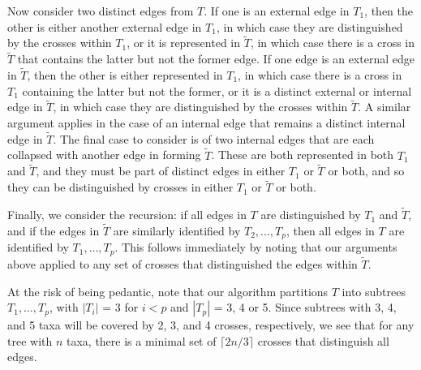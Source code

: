 \documentclass[12pt,letterpaper]{article}
\begin{document}
Now consider two distinct edges from $T$.  If one is an external edge in $T_1$,
then the other is either another external edge in $T_1$, in which case
they are distinguished by the crosses within $T_1$, or it is
represented in $\tilde{T}$, in which case there is a cross in
$\tilde{T}$ that contains the latter but not the former edge.  If one
edge is an external edge in $\tilde{T}$, then the other is either
represented in $T_1$, in which case there is a cross in $T_1$
containing the latter but not the former, or it is a distinct external
or internal edge in $\tilde{T}$, in which case they are distinguished
by the crosses within $\tilde{T}$.  A similar argument applies in the
case of an internal edge that remains a distinct internal edge in $\tilde{T}$.  The final
case to consider is of two internal edges that are each collapsed with
another edge in forming $\tilde{T}$.  These are both represented in
both $T_1$ and $\tilde{T}$, and they must be part of distinct edges in
either $T_1$ or $\tilde{T}$ or both, and so they can be distinguished
by crosses in either $T_1$ or $\tilde{T}$ or both.  

Finally, we consider the recursion: if all edges in $T$ are
distinguished by $T_1$ and $\tilde{T}$, and if the edges in
$\tilde{T}$ are similarly identified by $T_2, \dots, T_p$, then all
edges in $T$ are identified by $T_1, \dots, T_p$.  This follows
immediately by noting that our arguments above applied to any set of
crosses that distinguished the edges within $\tilde{T}$.  

At the risk of being pedantic, note that our algorithm partitions $T$
into subtrees $T_1, \dots, T_p$, with $|T_i|$ = 3 for $i < p$ and
$|T_p|$ = 3, 4 or 5.  Since subtrees with 3, 4, and 5 taxa will be
covered by 2, 3, and 4 crosses, respectively, we see that for
any tree with $n$ taxa, there is a minimal set of $\lceil 2n/3 \rceil$
crosses that distinguish all edges.  


\newpage
\end{document}
